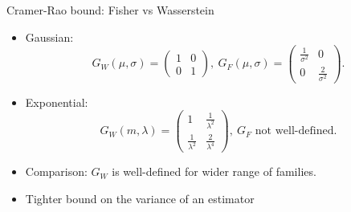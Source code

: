 \documentclass{beamer}
\begin{document}
\begin{frame}{Cramer-Rao bound: Fisher vs Wasserstein}
    \begin{itemize}
        \item Gaussian:
        \begin{equation*}
            G_W(\mu,\sigma)=\begin{pmatrix}
1 & 0 \\
0 &  1
\end{pmatrix}, \ G_F(\mu,\sigma) = \begin{pmatrix}
			\frac{1}{\sigma^2} & 0		\\
			0 & \frac{2}{\sigma^2}
		\end{pmatrix}.
        \end{equation*}
        \item Exponential:
        \begin{equation*}
            G_W(m,\lambda)=\begin{pmatrix}
    1 & \frac{1}{\lambda^2}     \\
    \frac{1}{\lambda^2} & \frac{2}{\lambda^4}
\end{pmatrix}, \ G_F \text{ not well-defined}.
        \end{equation*}
        \item Comparison:
        $G_W$ is well-defined for wider range of families.
         \item Tighter bound on the variance of an estimator
    \end{itemize}

\end{frame}
\end{document}
